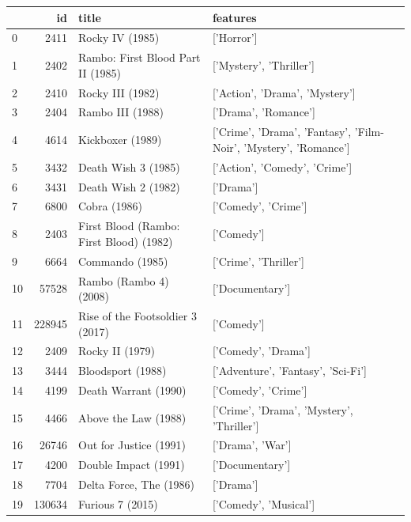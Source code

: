 
\begin{tabular}{lrll}
\toprule
 & id & title & features \\
\midrule
0 & 2411 & Rocky IV (1985) & ['Horror'] \\
1 & 2402 & Rambo: First Blood Part II (1985) & ['Mystery', 'Thriller'] \\
2 & 2410 & Rocky III (1982) & ['Action', 'Drama', 'Mystery'] \\
3 & 2404 & Rambo III (1988) & ['Drama', 'Romance'] \\
4 & 4614 & Kickboxer (1989) & ['Crime', 'Drama', 'Fantasy', 'Film-Noir', 'Mystery', 'Romance'] \\
5 & 3432 & Death Wish 3 (1985) & ['Action', 'Comedy', 'Crime'] \\
6 & 3431 & Death Wish 2 (1982) & ['Drama'] \\
7 & 6800 & Cobra (1986) & ['Comedy', 'Crime'] \\
8 & 2403 & First Blood (Rambo: First Blood) (1982) & ['Comedy'] \\
9 & 6664 & Commando (1985) & ['Crime', 'Thriller'] \\
10 & 57528 & Rambo (Rambo 4) (2008) & ['Documentary'] \\
11 & 228945 & Rise of the Footsoldier 3 (2017) & ['Comedy'] \\
12 & 2409 & Rocky II (1979) & ['Comedy', 'Drama'] \\
13 & 3444 & Bloodsport (1988) & ['Adventure', 'Fantasy', 'Sci-Fi'] \\
14 & 4199 & Death Warrant (1990) & ['Comedy', 'Crime'] \\
15 & 4466 & Above the Law (1988) & ['Crime', 'Drama', 'Mystery', 'Thriller'] \\
16 & 26746 & Out for Justice (1991) & ['Drama', 'War'] \\
17 & 4200 & Double Impact (1991) & ['Documentary'] \\
18 & 7704 & Delta Force, The (1986) & ['Drama'] \\
19 & 130634 & Furious 7 (2015) & ['Comedy', 'Musical'] \\
\bottomrule
\end{tabular}
